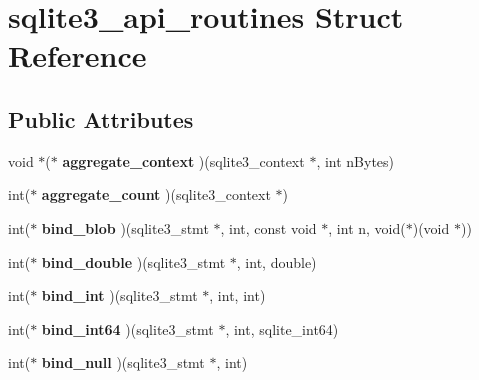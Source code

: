 \hypertarget{structsqlite3__api__routines}{}\section{sqlite3\+\_\+api\+\_\+routines Struct Reference}
\label{structsqlite3__api__routines}
\subsection*{Public Attributes}
\begin{DoxyCompactItemize}
\item 
\mbox{\label{structsqlite3__api__routines_a9ab2057c3042c5136b05f7daab66b4f4}} 
void $\ast$($\ast$ {\bfseries aggregate\+\_\+context} )(sqlite3\+\_\+context $\ast$, int n\+Bytes)
\item 
\mbox{\label{structsqlite3__api__routines_aa2f39986a5de8ec01fb5cb2aa573c08d}} 
int($\ast$ {\bfseries aggregate\+\_\+count} )(sqlite3\+\_\+context $\ast$)
\item 
\mbox{\label{structsqlite3__api__routines_a2e84de4afd1ba42151a75df4d7480a72}} 
int($\ast$ {\bfseries bind\+\_\+blob} )(sqlite3\+\_\+stmt $\ast$, int, const void $\ast$, int n, void($\ast$)(void $\ast$))
\item 
\mbox{\label{structsqlite3__api__routines_abcdefbe78ab3ce4324d86651c03e8470}} 
int($\ast$ {\bfseries bind\+\_\+double} )(sqlite3\+\_\+stmt $\ast$, int, double)
\item 
\mbox{\label{structsqlite3__api__routines_a70b6cc78957f11ff206df6125973daea}} 
int($\ast$ {\bfseries bind\+\_\+int} )(sqlite3\+\_\+stmt $\ast$, int, int)
\item 
\mbox{\label{structsqlite3__api__routines_ac71b110c165973291cc257973e7d6243}} 
int($\ast$ {\bfseries bind\+\_\+int64} )(sqlite3\+\_\+stmt $\ast$, int, sqlite\+\_\+int64)
\item 
\mbox{\label{structsqlite3__api__routines_a78d546c352de656db3c15e7cc6255228}} 
int($\ast$ {\bfseries bind\+\_\+null} )(sqlite3\+\_\+stmt $\ast$, int)

\end{DoxyCompactItemize}

